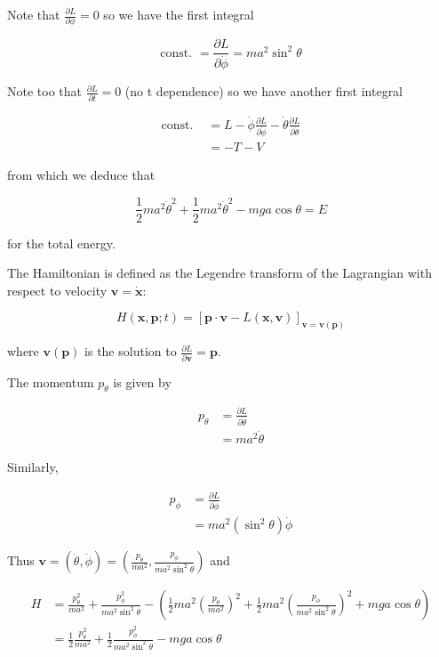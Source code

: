 \documentclass[a4paper]{article}
\begin{document}
Note that $ \frac{\partial L}{\partial \phi} = 0 $ so we have the first integral

\[ \text{const. } = \frac{\partial L }{\partial \dot{\phi}} = m a^{2} \sin^{2} \theta  \]

Note too that $ \frac{\partial L }{\partial t} = 0 $ (no t dependence) so we have another first integral

\begin{align*}
\text{const. } & = L - \dot{\phi} \frac{\partial L }{\partial \dot{\phi}} - \dot{\theta} \frac{\partial L }{\partial \dot{\theta}} \\
& = - T - V
\end{align*}

from which we deduce that

\[ \frac{1}{2} m a^{2} \dot{\theta}^{2}  + \frac{1}{2} m a^{2} \dot{\theta}^{2}  - mga \cos \theta = E \]

for the total energy.

The Hamiltonian is defined as the Legendre transform of the Lagrangian with respect to velocity $ \mathbf{v} = \dot{\mathbf{x}} $:

\[ H(\mathbf{x},\mathbf{p};t)  = [ \mathbf{p} \cdot \mathbf{v}  - L(\mathbf{x},\mathbf{v}) ]_{\mathbf{v} = \mathbf{v(\mathbf{p})}} \]

where $ \mathbf{v}(\mathbf{p}) $ is the solution to $ \frac{\partial L }{\partial \mathbf{v}} = \mathbf{p} $.

The momentum $ p_{\theta} $ is given by

\begin{align*}
p_{\theta}  & = \frac{\partial  L}{\partial \dot{\theta}} \\
& = m a^{2} \dot{\theta}
\end{align*}

Similarly,

\begin{align*}
p_{\phi} & = \frac{\partial  L}{\partial \dot{\phi}}  \\
& = m a^{2} (\sin^{2} \theta ) \dot{\phi}
\end{align*}

Thus $ \mathbf{v} = (\dot{\theta},\dot{\phi}) = \left(  \frac{p_{\theta}}{ma^{2}},  \frac{p_{\phi}}{ma^{2}\sin^{2}\theta   } \right)   $ and

\begin{align*}
H & = \frac{p_{\theta}^{2}}{ma^{2}} +  \frac{p_{\phi}^{2}}{ma^{2}\sin^{2}\theta } - \left(  \frac{1}{2} m a^{2} \left(  \frac{p_{\theta}}{ma^{2}}\right)^{2}   + \frac{1}{2} m a^{2} \left( \frac{p_{\phi}}{ma^{2}\sin^{2}\theta } \right)^{2}  + mga \cos \theta  \right)    \\
& =  \frac{1}{2} \frac{p_{\theta}^{2}}{ma^{2}} + \frac{1}{2} \frac{p_{\phi}^{2}}{ma^{2}\sin^{2}\theta } -mga \cos \theta
\end{align*}
\end{document}
